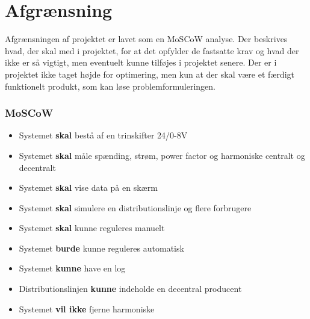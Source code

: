 

\section{Afgrænsning}
Afgrænsningen af projektet er lavet som en MoSCoW analyse. Der beskrives hvad, der skal med i projektet, for at det opfylder de fastsatte krav og hvad der ikke er så vigtigt, men eventuelt kunne tilføjes i projektet senere. Der er i projektet ikke taget højde for optimering, men kun at der skal være et færdigt funktionelt produkt, som kan løse problemformuleringen.
\subsubsection{MoSCoW}

\begin{itemize}
	\item{Systemet \textbf{skal} bestå af en trinskifter 24/0-8V}
	\item{Systemet \textbf{skal} måle spænding, strøm, power factor og harmoniske centralt og decentralt}
	\item{Systemet \textbf{skal} vise data på en skærm}
	\item{Systemet \textbf{skal} simulere en distributionslinje og flere forbrugere}
	\item{Systemet \textbf{skal} kunne reguleres manuelt}
	\item{Systemet \textbf{burde} kunne reguleres automatisk}
	\item{Systemet \textbf{kunne} have en log}
	\item{Distributionslinjen \textbf{kunne} indeholde en decentral producent}
	\item{Systemet \textbf{vil ikke} fjerne harmoniske} 
\end{itemize}	